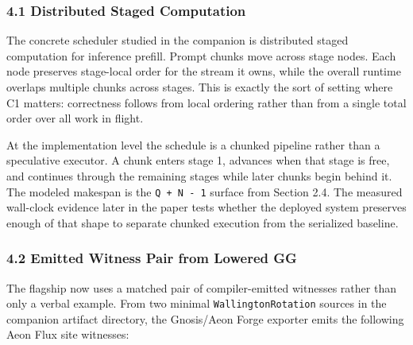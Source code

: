 \documentclass[
  11pt,
]{article}
\begin{document}
\subsubsection{4.1 Distributed Staged
Computation}\label{distributed-staged-computation}

The concrete scheduler studied in the companion is distributed staged
computation for inference prefill. Prompt chunks move across stage
nodes. Each node preserves stage-local order for the stream it owns,
while the overall runtime overlaps multiple chunks across stages. This
is exactly the sort of setting where C1 matters: correctness follows
from local ordering rather than from a single total order over all work
in flight.

At the implementation level the schedule is a chunked pipeline rather
than a speculative executor. A chunk enters stage 1, advances when that
stage is free, and continues through the remaining stages while later
chunks begin behind it. The modeled makespan is the
\texttt{Q\ +\ N\ -\ 1} surface from Section 2.4. The measured wall-clock
evidence later in the paper tests whether the deployed system preserves
enough of that shape to separate chunked execution from the serialized
baseline.

\subsubsection{4.2 Emitted Witness Pair from Lowered
GG}\label{emitted-witness-pair-from-lowered-gg}

The flagship now uses a matched pair of compiler-emitted witnesses
rather than only a verbal example. From two minimal
\texttt{WallingtonRotation} sources in the companion artifact directory,
the Gnosis/Aeon Forge exporter emits the following Aeon Flux site
witnesses:
\end{document}
